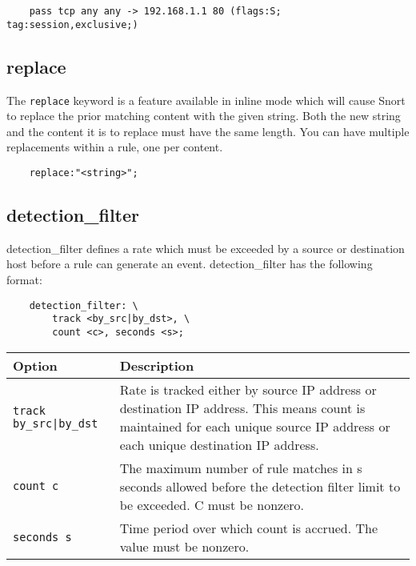 \documentclass[english]{report}
\begin{document}
\begin{verbatim}
    pass tcp any any -> 192.168.1.1 80 (flags:S; tag:session,exclusive;)
\end{verbatim}

\subsection{replace}
\label{replace}

The \texttt{replace} keyword is a feature available in inline mode which will
cause Snort to replace the prior matching content with the given string.  Both
the new string and the content it is to replace must have the same length.  You
can have multiple replacements within a rule, one per content.

\begin{verbatim}
    replace:"<string>";
\end{verbatim}

\subsection{detection\_filter}
\label{detection_filter}

detection\_filter defines a rate which must be exceeded by a source or
destination host before a rule can generate an event.  detection\_filter has
the following format:

\begin{verbatim}
    detection_filter: \
        track <by_src|by_dst>, \
        count <c>, seconds <s>;
\end{verbatim}

\begin{table}[h]
\begin{center}
\begin{tabular}{| p{1in} | p{4.5in} |}

\hline
Option & Description \\
\hline

\hline
\texttt{track by\_src|by\_dst} &

Rate is tracked either by source IP address or destination IP address.  This
means count is maintained for each unique source IP address or each unique
destination IP address.\\

\hline
\texttt{count c} &

The maximum number of rule matches in s seconds allowed before the detection
filter limit to be exceeded.  C must be nonzero.\\

\hline
\texttt{seconds s} &

Time period over which count is accrued.  The value must be nonzero.\\

\hline
\end{tabular}
\end{center}
\end{table}
\end{document}
